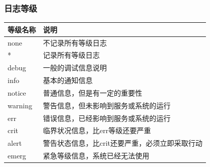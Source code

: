 \documentclass[xcolor=svgnames,presentation]{beamer}
\begin{document}
\begin{frame}
\frametitle{日志等级}
\label{sec-6-6}


\begin{center}
\begin{tabular}{ll}
 等级名称  &  说明                                            \\
\hline
 none      &  不记录所有等级日志                              \\
 *         &  记录所有等级日志                                \\
 debug     &  一般的调试信息说明                              \\
 info      &  基本的通知信息                                  \\
 notice    &  普通信息，但是有一定的重要性                    \\
 warning   &  警告信息，但未影响到服务或系统的运行            \\
 err       &  错误信息，已经影响到服务或系统的运行            \\
 crit      &  临界状况信息，比err等级还要严重                 \\
 alert     &  警告状态信息，比crit还要严重，必须立即采取行动  \\
 emerg     &  紧急等级信息，系统已经无法使用                  \\
\end{tabular}
\end{center}
\end{frame}
\end{document}
